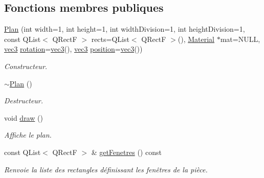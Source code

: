 \subsection*{Fonctions membres publiques}
\begin{DoxyCompactItemize}
\item 
\hyperlink{class_plan_ab74eeb948e40ade24bd54a60a4ece8c6}{Plan} (int width=1, int height=1, int width\+Division=1, int height\+Division=1, const Q\+List$<$ Q\+Rect\+F $>$ rects=Q\+List$<$ Q\+Rect\+F $>$(), \hyperlink{class_material}{Material} $\ast$mat=N\+U\+L\+L, \hyperlink{structvec3}{vec3} \hyperlink{class_objet_ac69a1b459bcb4433099c8cfbff06b209}{rotation}=\hyperlink{structvec3}{vec3}(), \hyperlink{structvec3}{vec3} \hyperlink{class_objet_a0e109bc790b14328202dd2546b04e2fd}{position}=\hyperlink{structvec3}{vec3}())
\begin{DoxyCompactList}\small\item\em Constructeur. \end{DoxyCompactList}\item 
\hyperlink{class_plan_a4df05d0211ed4572125f79cbfaafa626}{$\sim$\+Plan} ()
\begin{DoxyCompactList}\small\item\em Destructeur. \end{DoxyCompactList}\item 
void \hyperlink{class_plan_a513c3dec0ce9043a9e1d3b5b18a6d698}{draw} ()
\begin{DoxyCompactList}\small\item\em Affiche le plan. \end{DoxyCompactList}\item 
const Q\+List$<$ Q\+Rect\+F $>$ \& \hyperlink{class_plan_ac193f6297c584d43977dca3a16f18180}{get\+Fenetres} () const 
\begin{DoxyCompactList}\small\item\em Renvoie la liste des rectangles définissant les fenêtres de la pièce. \end{DoxyCompactList}\end{DoxyCompactItemize}
